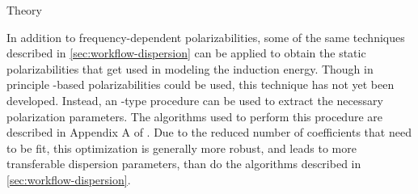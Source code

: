 \begin{paragraph}{Theory}

In addition to frequency-dependent polarizabilities, some of the same techniques
described in \cref{sec:workflow-dispersion} can be applied to obtain the
static polarizabilities that get used in modeling the
\sapt induction energy. Though in principle \isa-based polarizabilities could be
used, this technique has not yet been developed. Instead, an \idma-type
procedure can be used to extract the necessary polarization parameters. The
algorithms used to perform this procedure are described in Appendix A of
. Due to the reduced number of coefficients that need to
be fit, this optimization is generally more robust, and leads to more
transferable dispersion parameters, than do the algorithms described in
\cref{sec:workflow-dispersion}.

\end{paragraph}
